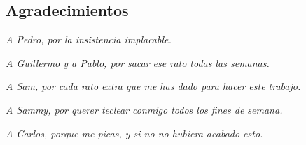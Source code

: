 \documentclass[12pt,a4paper]{report}
\begin{document}
\begin{flushright}
  \section*{Agradecimientos}

  \emph{A Pedro, por la insistencia implacable.}

  \emph{A Guillermo y a Pablo, por sacar ese rato todas las semanas.}

  \emph{A Sam, por cada rato extra que me has dado para hacer este trabajo.}

  \emph{A Sammy, por querer teclear conmigo todos los fines de semana.}

  \emph{A Carlos, porque me picas, y si no no hubiera acabado esto.}

\end{flushright}

\clearpage

\tableofcontents
\listoffigures
\listoftables

\clearpage


















\begin{appendices}
\renewcommand*{\thechapter}{\arabic{chapter}}






\end{appendices}
\end{document}
